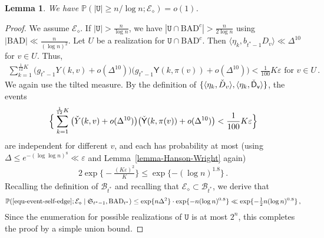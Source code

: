 \documentclass[11pt]{article}
\newtheorem{Lemma}[Theorem]{Lemma}
\numberwithin{equation}{section}
\begin{document}
\begin{Lemma}\label{lem-self-loops}
We have $\mathbb P(|\mathtt U| \geq n/\log n; \mathcal E_\diamond) = o(1)$.
\end{Lemma}
\begin{proof}
We assume $\mathcal E_\diamond$. If $|\mathtt U| > \frac{n}{\log n}$,  we have $|\mathtt U \cap \mathrm{BAD}^{c} | > \frac{n}{2 \log n}$ using $|\mathrm{BAD}| \ll \frac{n}{(\log n)^2}$. Let $U$ be a realization for $\mathtt U \cap \mathrm{BAD}^{c}$. Then $\langle \eta_k, b_{t^*-1} D_v \rangle \ll \Delta^{10}$  for $v \in U$. Thus,
\begin{align}
    \sum_{k=1}^{\frac{1}{12}K} \big( g_{t^*-1} Y(k,v) + o(\Delta^{10}) \big) \big( g_{t^*-1} \mathsf{Y}(k,\pi(v)) + o(\Delta^{10}) \big) < \frac{1}{100} K \varepsilon \mbox{ for } v \in U \,.
    \label{equ-event-self-edge}
\end{align}
We again use the tilted measure. By the definition of $\{ \langle \eta_k, \Check{D}_v \rangle, \langle \eta_k, \Check{\mathsf{D}}_{\mathsf{v}} \rangle \}$, the events 
\begin{align*}
    \Big\{  \sum_{k=1}^{\frac{1}{12}K} \big( \Check{Y}(k,v) + o(\Delta^{10}) \big) \big( \Check{\mathsf{Y}}(k, \pi(v))  + o(\Delta^{10}) \big) < \frac{1}{100} K \varepsilon \Big\}
\end{align*}
are independent for different $v$, and each has probability at most (using $\Delta \leq e^{-(\log \log n)^8} \ll \varepsilon$ and Lemma~\ref{lemma-Hanson-Wright} again)
\begin{align*}
    2 \exp \big\{ -\frac{ (K \varepsilon)^2 }{ K } \big\} \leq \exp \{ - (\log n)^{1.8} \} \,.
\end{align*}
Recalling the definition of $\mathcal B_{t^*}$ and recalling that $\mathcal E_\diamond \subset \mathcal B_{t^*}$, we derive that
\begin{align*}
   \mathbb P(\eqref{equ-event-self-edge}; \mathcal E_\diamond\mid \mathfrak S_{t^* - 1}, \mathrm{BAD}_{t^*}) \leq \exp \{ n \Delta^2 \}  \cdot \exp \{ - n (\log n)^{0.8}  \} \ll \exp \{ - \tfrac{1}{2} n(\log n)^{0.8}  \} \,,
\end{align*}
Since the enumeration for possible realizations of $\mathtt U$ is at most $2^n$, this completes the proof by a simple union bound.
\end{proof}
\end{document}
